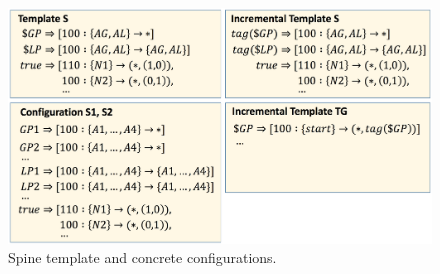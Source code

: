 \documentclass[numbers, 10pt, preprint]{sigplanconf}
\newcommand{\KW}[1]{\texttt{\small\bfseries{#1}}}
\begin{document}
%
%
%
%

\newcommand{\highlight}[1]{%
  \colorbox{red!50}{$\displaystyle#1$}}
\newcommand{\Router}[1]{\KW{Router} #1:}
\newcommand{\Template}[1]{\KW{Template} #1:}
\newcommand{\REGEX}[1]{\texttt{regex}(#1)}
\newcommand{\PEER}{\texttt{peer}}
\newcommand{\PREFIX}{\texttt{prefix}}
\newcommand{\IF}{\texttt{if}}
\newcommand{\THEN}{\texttt{then}}
\newcommand{\COMM}{\texttt{comm}}
\newcommand{\MED}{\texttt{MED}}
\newcommand{\Arrow}{\ensuremath{\leftarrow}}

\begin{figure}[t!]


  \begin{center}
  \includegraphics[width=.8\columnwidth]{figures/configs}  
  \end{center}
  \vspace{-1em}
  \caption{Spine template and concrete configurations.}
  \label{fig:bgp-configs}
\end{figure}
\end{document}
